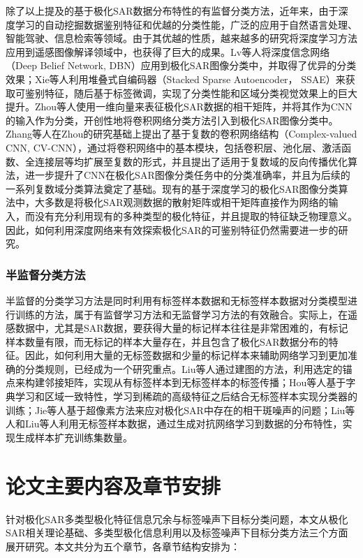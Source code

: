 除了以上提及的基于极化SAR数据分布特性的有监督分类方法，近年来，由于深度学习的自动挖掘数据鉴别特征和优越的分类性能，广泛的应用于自然语言处理、智能驾驶、信息检索等领域。由于其优越的性质，越来越多的研究将深度学习方法应用到遥感图像解译领域中，也获得了巨大的成果。Lv等人将深度信念网络（Deep Belief Network, DBN）应用到极化SAR图像分类中，并取得了优异的分类效果；Xie等人利用堆叠式自编码器（Stacked Sparse Autoencoder， SSAE）来获取可鉴别特征，随后基于标签微调，实现了分类性能和区域分类视觉效果上的巨大提升。Zhou等人使用一维向量来表征极化SAR数据的相干矩阵，并将其作为CNN的输入作为分类，开创性地将卷积网络分类方法引入到极化SAR图像分类中。Zhang等人在Zhou的研究基础上提出了基于复数的卷积网络结构（Complex-valued CNN, CV-CNN），通过将卷积网络中的基本模块，包括卷积层、池化层、激活函数、全连接层等均扩展至复数的形式，并且提出了适用于复数域的反向传播优化算法，进一步提升了CNN在极化SAR图像分类任务中的分类准确率，并且为后续的一系列复数域分类算法奠定了基础。现有的基于深度学习的极化SAR图像分类算法中，大多数是将极化SAR观测数据的散射矩阵或相干矩阵直接作为网络的输入，而没有充分利用现有的多种类型的极化特征，并且提取的特征缺乏物理意义。因此，如何利用深度网络来有效探索极化SAR的可鉴别特征仍然需要进一步的研究。

\subsubsection{半监督分类方法}
半监督的分类学习方法是同时利用有标签样本数据和无标签样本数据对分类模型进行训练的方法，属于有监督学习方法和无监督学习方法的有效融合。实际上，在遥感数据中，尤其是SAR数据，要获得大量的标记样本往往是非常困难的，有标记样本数量有限，而无标记的样本大量存在，并且包含了极化SAR数据分布的特征。因此，如何利用大量的无标签数据和少量的标记样本来辅助网络学习到更加准确的分类规则，已经成为一个研究重点。Liu等人通过建图的方法，利用选定的锚点来构建邻接矩阵，实现从有标签样本到无标签样本的标签传播；Hou等人基于字典学习和区域一致特性，学习到稀疏的高级特征之后结合无标签样本实现分类器的训练；Jie等人基于超像素方法来应对极化SAR中存在的相干斑噪声的问题；Liu等人和Liu等人利用无标签样本数据，通过生成对抗网络学习到数据的分布特性，实现生成样本扩充训练集数量。

\section{论文主要内容及章节安排}
针对极化SAR多类型极化特征信息冗余与标签噪声下目标分类问题，本文从极化SAR相关理论基础、多类型极化信息利用以及标签噪声下目标分类方法三个方面展开研究。本文共分为五个章节，各章节结构安排为：


